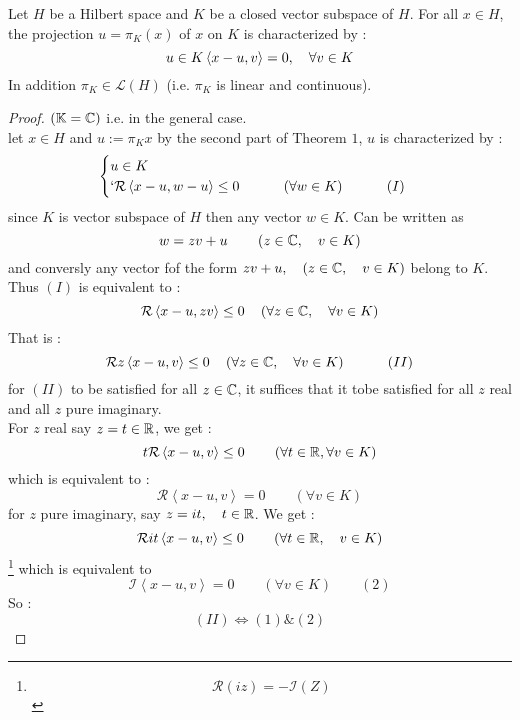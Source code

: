 \begin{corollary}[]
Let $H $ be a Hilbert space and $K $ be 
a closed vector subspace of $H $. For all 
$x \in  H$, the projection $u = \pi _{K}(x)  $   
of $x $ on $K $ is characterized by : 
\[
  u \in  K \\
  \left\langle 
    x-u, v
  \right\rangle=
   0 , \quad \forall  v \in  K
\]
In addition $\pi _{K} \in 
\mathcal{L} (H)$ (i.e. $\pi _{K} $ 
is linear and continuous).
\begin{proof}
$(\mathbb{K} = \mathbb{C} )$ i.e. in the general case. \\ 
let $x \in  H$ and $u := \pi _{K}{x} $ 
by the second part of Theorem $1$, $u $ 
is characterized by : 
\[
  \begin{cases}
    u \in  K \\`
    \mathcal{R} \left\langle 
      x-u, w-u
    \right\rangle  \leq 0 \quad  \quad \quad 
    \left( \forall w \in  K\right) 
    \quad  \quad \quad (I) 
  \end{cases}
\]
since $K $ is vector subspace of $H $ then 
any vector $w \in  K $. Can be written 
as 
\[
w = z v + u \quad \quad \left( 
  z \in  \mathbb{C} , \quad v \in K
\right)
\]
and conversly any vector fof the form 
$zv + u, \quad (z \in  \mathbb{C}, \quad v \in K) $ belong 
to $K $. Thus $(I)$ is equivalent to : 
\[
\mathcal{R} \left\langle 
  x-u, zv
\right\rangle  \leq 0 \quad \left( 
  \forall  z \in \mathbb{C} , \quad  \forall v \in  K
\right)
\]
That is : 
\[
\mathcal{R} 
z
\left\langle 
  x-u, 
  v
\right\rangle  \leq 0 \quad \left( 
  \forall z \in  \mathbb{C} , \quad 
  \forall v \in  K
\right) \quad \quad \quad 
(II) 
\]
for $(II)$ to be satisfied for all 
$z \in  \mathbb{C}$, 
it suffices that it tobe satisfied
for all $z$ real and 
all $z $ pure imaginary. \\
For $z $ real say $z = t \in \mathbb{R}  $, we get : 
\[
t \mathcal{R} \left\langle 
  x-u, v
\right\rangle  \leq 0 \quad \quad 
\left( 
  \forall  t \in  \mathbb{R} ,
  \forall  v \in  K
\right)
\]
which is equivalent to : 
\[
\mathcal{R} \left\langle 
  x-u, v
\right\rangle  = 0 \quad \quad 
\left( 
  \forall  v \in  K
\right)
\]
for $z $ pure imaginary, say $z = 
it, \quad t \in \mathbb{R} $. We get : 
\[
  \mathcal{R} 
  it \left\langle 
    x-u, v
  \right\rangle  \leq 0 \quad 
  \quad 
  \left( 
    \forall t \in \mathbb{R} , \quad 
    v \in  K
  \right)
\]
\footnote{
  \[
  \mathcal{R}(iz)   = - \mathcal{I}  (Z) 
  \]
}
which is equivalent to 
\[
\mathcal{I} 
\left\langle 
  x-u, v
\right\rangle  = 0 \quad 
\quad \left( 
  \forall v \in  K
\right) \quad \quad (2) 
\]
So : 
\[
  (II)  \iff (1)  \& (2) 
\]
\end{proof}
\end{corollary}
